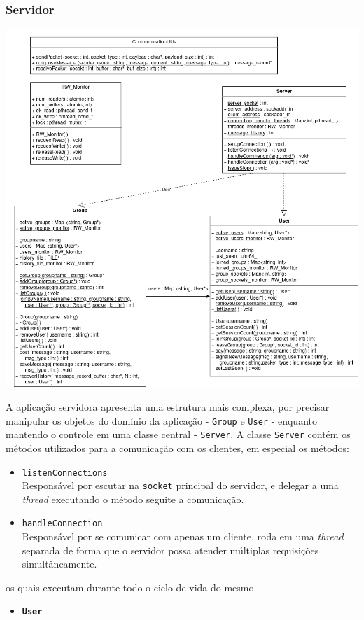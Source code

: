 \documentclass{article}
\begin{document}
\subsubsection{Servidor}
    \includegraphics[width=1.0\textwidth]{Server.png}
\par A aplicação servidora apresenta uma estrutura mais complexa, por precisar manipular os objetos do domínio da aplicação - \texttt{Group} e \texttt{User} - enquanto mantendo o controle em uma classe central - \texttt{Server}. A classe \texttt{Server} contém os métodos utilizados para a comunicação com os clientes, em especial os métodos:
\begin{itemize}
    \item \texttt{listenConnections}
    \\ Responsável por escutar na \texttt{socket} principal do servidor, e delegar a uma \textit{thread} executando o método seguite a comunicação.
    \item \texttt{handleConnection}
    \\ Responsável por se comunicar com apenas um cliente, roda em uma \textit{thread} separada de forma que o servidor possa atender múltiplas requisições simultâneamente.
\end{itemize}
os quais executam durante todo o ciclo de vida do mesmo.
\begin{itemize}
    \item \textbf{\texttt{User}}
\end{itemize}
\end{document}
